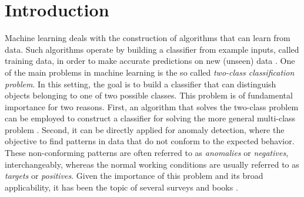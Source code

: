 \section{Introduction}\label{sec:intro}

Machine learning deals with the construction of algorithms that can learn from data. Such algorithms operate by building a classifier from example inputs, called training data, in order to make accurate predictions on new (unseen) data \cite{bishop_pattern_2006}.
One of the main problems in machine learning is the so called \emph{two-class classification problem}. In this setting, the goal is to build a classifier that can distinguish objects belonging to one of two possible classes.
This problem is of fundamental importance for two reasons. 
First, an algorithm that solves the two-class problem can be employed to construct a classifier for solving the more general multi-class problem \cite{bishop_pattern_2006}.
Second, it can be directly applied for anomaly detection, where the objective to find patterns in data that do not conform to the expected behavior.
These non-conforming patterns are often referred to as \emph{anomalies} or \emph{negatives}, interchangeably, whereas the normal working conditions are usually referred to as \emph{targets} or \emph{positives}.
Given the importance of this problem and its broad applicability, it has been the topic of several surveys and books \cite{hodge_survey_2004, isermann_faultdiagnosis_2006, chandola_anomaly_2009}.

